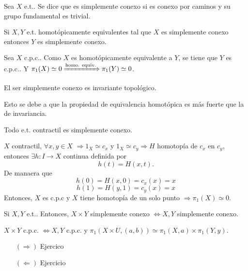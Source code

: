 \begin{defn}
  Sea $X$ e.t.. Se dice que es simplemente conexo si es conexo por caminos y su grupo fundamental es trivial.
\end{defn}

\begin{prop}
  Si $X,Y$ e.t. homotópicamente equivalentes tal que $X$ es simplemente conexo entonces $Y$ es simplemente conexo.
\end{prop}

\begin{dem}
  Sea $X$ c.p.c.. Como $X$ es homotópicamente equivalente a $Y$, se tiene que $Y$ es c.p.c.. Y $\pi_{1}(X) \simeq 0 \xRightarrow[]{ \text{homo. equiv.} } \pi_{1}(Y) \simeq 0$.
\end{dem}

\begin{cor}
  El ser simplemente conexo es invariante topológico.
\end{cor}

\begin{dem}
  Esto se debe a que la propiedad de equivalencia homotópica es más fuerte que la de invariancia.
\end{dem}

\begin{prop}
  Todo e.t. contractil es simplemente conexo.
\end{prop}

\begin{dem}
  $X$ contractil, $\forall x, y \in X$ $\Rightarrow 1_{X} \simeq c_{x}$ y $1_{X} \simeq c_{y} \Rightarrow H$ homotopía de $c_{x}$ en $c_{y}$, entonces $\exists h : I \to X$ continua definida por 
  \[ 
    h(t) = H(x,t).
  \]  
  De manaera que
  \[ 
    h(0) = H(x,0) = c_{x}(x) = x 
  \] 
  \[ 
    h(1) = H(y, 1) = c_{y}(x) = x
  \] 
  Entonces, $X$ es c.p.c y $X$ tiene homotopía de un solo punto $\Rightarrow \pi_{1}(X) \simeq 0$.
\end{dem}

\begin{prop}
  Si $X, Y$ e.t.. Entonces, $X \times Y$ simplemente conexo $\Leftrightarrow X, Y$ simplemente conexo.
\end{prop}

\begin{dem}
  $X \times Y$ c.p.c. $\Leftrightarrow X, Y$ c.p.c. y $\pi_{1}(X \times U, (a, b)) \simeq \pi_{1}(X,a) \times \pi_{1}(Y, y)$.
  \begin{enumerate}[label=(\roman*)]
    \item [$(\Rightarrow)$] Ejercico
    \item [$(\Leftarrow)$] Ejercicio
  \end{enumerate}
\end{dem}

